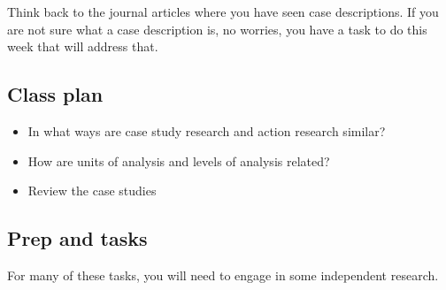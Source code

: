 \documentclass[]{book}
\theoremstyle{definition}
\theoremstyle{definition}
\theoremstyle{definition}
\theoremstyle{remark}
\begin{document}
Think back to the journal articles where you have seen case
descriptions. If you are not sure what a case description is, no
worries, you have a task to do this week that will address that.

\hypertarget{class-plan-4}{%
\subsection*{Class plan}\label{class-plan-4}}

\begin{itemize}
\item
  In what ways are case study research and action research similar?
\item
  How are units of analysis and levels of analysis related?
\item
  Review the case studies
\end{itemize}

\hypertarget{prep-and-tasks-4}{%
\subsection*{Prep and tasks}\label{prep-and-tasks-4}}

For many of these tasks, you will need to engage in some independent
research.
\end{document}
